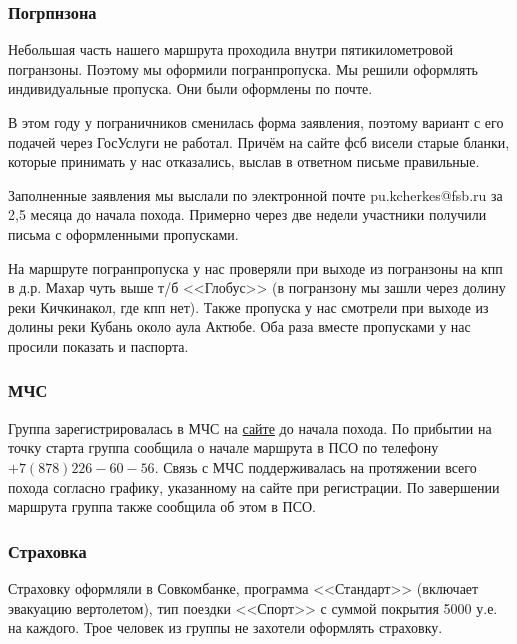 			\setlength{\arrayrulewidth}{0.3mm}
			\setlength{\arraycolsep}{5pt}
			\renewcommand{\arraystretch}{1.8}

		\subsubsection{Погрпнзона}
			Небольшая часть нашего маршрута проходила внутри пятикилометровой погранзоны. Поэтому мы оформили
			погранпропуска. Мы решили оформлять индивидуальные пропуска. Они были оформлены по почте. 
			
			В этом году у пограничников сменилась форма заявления, поэтому вариант с его подачей через ГосУслуги
			не работал. Причём на сайте фсб висели старые бланки, которые принимать у нас отказались, выслав в
			ответном письме правильные.
			
			Заполненные заявления мы выслали по электронной почте pu.kcherkes@fsb.ru за 2,5 месяца до начала похода.
			Примерно через две недели участники получили письма с оформленными пропусками. 
			
			На маршруте погранпропуска у нас проверяли при выходе из погранзоны на кпп в д.р. Махар чуть выше
			т/б <<Глобус>> (в погранзону мы зашли через долину реки Кичкинакол, где кпп нет). Также пропуска
			у нас смотрели при выходе из долины реки Кубань около аула Актюбе. Оба раза вместе  пропусками у
			нас просили показать и паспорта.


		\subsubsection{МЧС}
			Группа зарегистрировалась в МЧС на \href{https://forms.mchs.gov.ru/registration_tourist_groups}{сайте}
			до начала похода. По прибытии на точку старта группа сообщила о начале маршрута в ПСО по телефону
			$+7 (878) 226-60-56$. Связь с МЧС поддерживалась на протяжении всего похода согласно графику, указанному
			на сайте при регистрации. По завершении маршрута группа также сообщила об этом в ПСО.

		\subsubsection{Страховка}
			Страховку оформляли в Совкомбанке, программа <<Стандарт>> (включает эвакуацию вертолетом), тип поездки
			<<Спорт>> с суммой покрытия 5000 у.е. на каждого. Трое человек из группы не захотели оформлять страховку.
 
